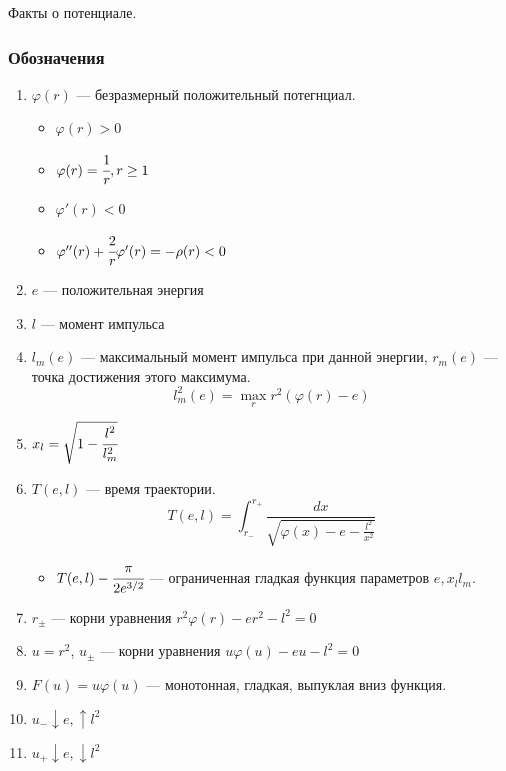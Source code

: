 


	Факты о потенциале.
	\subsubsection{Обозначения}
	\begin{enumerate}
		\item $\varphi(r)$ --- безразмерный положительный потегнциал.
		\begin{itemize}
			\item $\varphi(r) > 0$
			\item $\varphi(r) = \cfrac{1}{r}, r \ge 1$
			\item $\varphi'(r) < 0$
			\item $\varphi''(r) + \cfrac{2}{r}\varphi'(r) = -\rho(r) < 0$
		\end{itemize}
		\item $e$ --- положительная энергия
		\item $l$ --- момент импульса
		\item $l_m(e)$ --- максимальный момент импульса при данной энергии, $r_m(e)$ --- точка достижения этого максимума.
		\begin{equation}
			l^2_m(e) = \max_r{r^2(\varphi(r)-e)}
			\label{eq:l_m_e}
		\end{equation}
		\item $x_l = \sqrt{1 - \cfrac{l^2}{l_m^2}}$
		\item $T(e,l)$ --- время траектории.
		\begin{equation*}
			T(e,l) = \int_{r_{-}}^{r_{+}}\frac{dx}{ \sqrt{\varphi(x) -e - \frac{l^{2}}{x^{2}}}}
		\end{equation*}
		\begin{itemize}
			\item $T(e,l) - \cfrac{\pi}{2e^{3/2}}$ --- ограниченная гладкая функция параметров $e, x_l l_m$.
		\end{itemize}
		\item $r_{\pm}$ --- корни уравнения $r^2\varphi(r)-er^2-l^2=0$
		\item $u = r^2$, $u_{\pm}$ --- корни уравнения  $u\varphi(u)-eu-l^2=0$
		\item $F(u) = u\varphi(u)$ --- монотонная, гладкая, выпуклая вниз функция.
		\item $u_{-} \downarrow e, \uparrow l^2$
		\item $u_{+} \downarrow e, \downarrow l^2$
	\end{enumerate}
	
